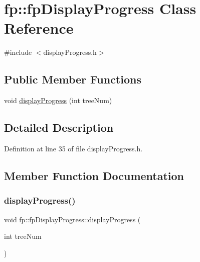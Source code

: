 \hypertarget{classfp_1_1fpDisplayProgress}{}\section{fp\+:\+:fp\+Display\+Progress Class Reference}
\label{classfp_1_1fpDisplayProgress}


{\ttfamily \#include $<$display\+Progress.\+h$>$}

\subsection*{Public Member Functions}
\begin{DoxyCompactItemize}
\item 
void \hyperlink{classfp_1_1fpDisplayProgress_adf5b2e390618d63eccb6de3b00eb857b}{display\+Progress} (int tree\+Num)
\end{DoxyCompactItemize}


\subsection{Detailed Description}


Definition at line 35 of file display\+Progress.\+h.



\subsection{Member Function Documentation}
\mbox{\label{classfp_1_1fpDisplayProgress_adf5b2e390618d63eccb6de3b00eb857b}} 
\subsubsection{\texorpdfstring{display\+Progress()}{displayProgress()}}
{\footnotesize\ttfamily void fp\+::fp\+Display\+Progress\+::display\+Progress (\begin{DoxyParamCaption}\item[{int}]{tree\+Num }\end{DoxyParamCaption})\hspace{0.3cm}{\ttfamily [inline]}}



